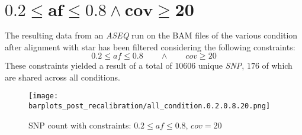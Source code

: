 \documentclass{article}
\begin{document}
\section*{$\mathbf{0.2\le af\le 0.8\land cov\ge 20}$}
The resulting data from an \emph{ASEQ} run on the BAM files of the various condition after alignment with star has been filtered considering the following constraints:
  $$0.2\le af\le 0.8\qquad\land\qquad cov\ge 20$$
	These constraints yielded a result of a total of $10606$ unique \emph{SNP}, $176$ of which are shared across all conditions.
\begin{figure}[H]
  \texttt{[image: barplots\_post\_recalibration/all\_condition.0.2.0.8.20.png]}
\caption{SNP count with constraints: $0.2\le af \le 0.8$, $cov = 20$ }
\end{figure}

\end{document}
